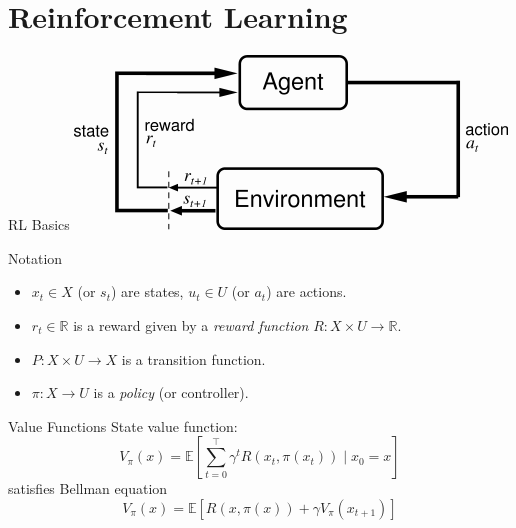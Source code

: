 \documentclass{beamer}
\begin{document}
\section{Reinforcement Learning}

\begin{frame}{RL Basics}
  \includegraphics[keepaspectratio,width=\textwidth]{assets/agent_env}
\end{frame}

\begin{frame}{Notation}
  \begin{itemize}
    \item $x_t \in X$ (or $s_t$) are states, $u_t \in U$ (or $a_t$) are actions. 
    \item $r_t \in \mathbb{R}$ is a reward given by a \emph{reward function} $R : X \times U \rightarrow \mathbb{R}$.
    \item $P: X \times U \rightarrow X$ is a transition function.
    \item $\pi: X \rightarrow U$ is a \emph{policy} (or controller).
  \end{itemize}
\end{frame}

\begin{frame}{Value Functions}
  State value function:
  \begin{equation}
    V_\pi(x) = \mathbb{E}\left[\sum_{t=0}^\top \gamma^t R(x_t, \pi(x_t)) \mid x_0 = x\right]
  \end{equation}
  satisfies Bellman equation
  \begin{equation}
    V_\pi(x) = \mathbb{E}\left[R(x, \pi(x)) + \gamma V_\pi(x_{t+1})\right]
  \end{equation}
\end{frame}
\end{document}
